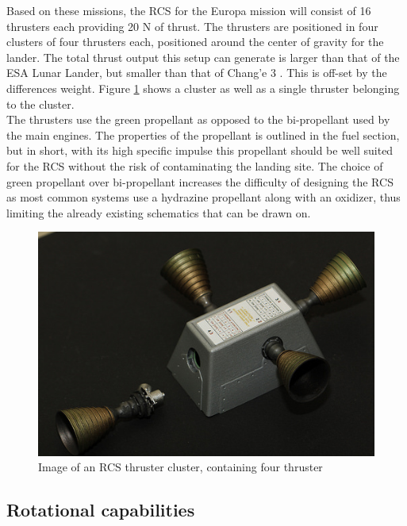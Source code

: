 Based on these missions, the RCS for the Europa mission will consist of 16 thrusters each providing 20 N of thrust. The thrusters are positioned in four clusters of four thrusters each, positioned around the center of gravity for the lander. The total thrust output this setup can generate is larger than that of the ESA Lunar Lander, but smaller than that of Chang'e 3 \cite{ESA_pic} \cite{Chang_e_3}. This is off-set  by the differences weight. Figure \ref{fig:RCS_thruster} shows a cluster as well as a single thruster belonging to the cluster.\\

The thrusters use the green propellant as opposed to the bi-propellant used by the main engines. The properties of the propellant is outlined in the fuel section, but in short, with its high specific impulse this propellant should be well suited for the RCS without the risk of contaminating the landing site. The choice of green propellant over bi-propellant increases the difficulty of designing the RCS as most common systems use a hydrazine propellant along with an oxidizer, thus limiting the already existing schematics that can be drawn on.

\begin{figure}[htb]
\begin{center}
\includegraphics[scale=0.6]{figures/RCS/RCS_thruster2}
\caption{Image of an RCS thruster cluster, containing four thruster \cite{RCS_pic}}
\label{fig:RCS_thruster}
\end{center}
\end{figure}


\subsection{Rotational capabilities}

